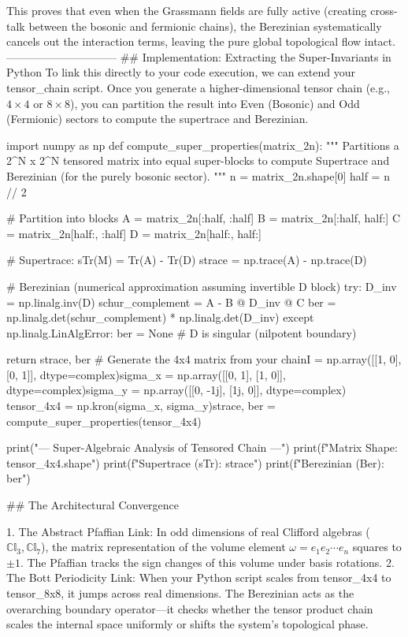 This proves that even when the Grassmann fields are fully active (creating cross-talk between the bosonic and fermionic chains), the Berezinian systematically cancels out the interaction terms, leaving the pure global topological flow intact.
------------------------------
## Implementation: Extracting the Super-Invariants in Python
To link this directly to your code execution, we can extend your tensor_chain script. Once you generate a higher-dimensional tensor chain (e.g., $4\times4$ or $8\times8$), you can partition the result into Even (Bosonic) and Odd (Fermionic) sectors to compute the supertrace and Berezinian.

import numpy as np
def compute_super_properties(matrix_2n):
    """
    Partitions a 2^N x 2^N tensored matrix into equal super-blocks
    to compute Supertrace and Berezinian (for the purely bosonic sector).
    """
    n = matrix_2n.shape[0]
    half = n // 2
    
    # Partition into blocks
    A = matrix_2n[:half, :half]
    B = matrix_2n[:half, half:]
    C = matrix_2n[half:, :half]
    D = matrix_2n[half:, half:]
    
    # Supertrace: sTr(M) = Tr(A) - Tr(D)
    strace = np.trace(A) - np.trace(D)
    
    # Berezinian (numerical approximation assuming invertible D block)
    try:
        D_inv = np.linalg.inv(D)
        schur_complement = A - B @ D_inv @ C
        ber = np.linalg.det(schur_complement) * np.linalg.det(D_inv)
    except np.linalg.LinAlgError:
        ber = None # D is singular (nilpotent boundary)
        
    return strace, ber
# Generate the 4x4 matrix from your chainI = np.array([[1, 0], [0, 1]], dtype=complex)sigma_x = np.array([[0, 1], [1, 0]], dtype=complex)sigma_y = np.array([[0, -1j], [1j, 0]], dtype=complex)
tensor_4x4 = np.kron(sigma_x, sigma_y)strace, ber = compute_super_properties(tensor_4x4)

print("--- Super-Algebraic Analysis of Tensored Chain ---")
print(f"Matrix Shape: {tensor_4x4.shape}")
print(f"Supertrace (sTr): {strace}")
print(f"Berezinian (Ber): {ber}")

## The Architectural Convergence

   1. The Abstract Pfaffian Link: In odd dimensions of real Clifford algebras ($\mathbb{Cl}_3, \mathbb{Cl}_7$), the matrix representation of the volume element $\omega = e_1 e_2 \cdots e_n$ squares to $\pm 1$. The Pfaffian tracks the sign changes of this volume under basis rotations.
   2. The Bott Periodicity Link: When your Python script scales from tensor_4x4 to tensor_8x8, it jumps across real dimensions. The Berezinian acts as the overarching boundary operator—it checks whether the tensor product chain scales the internal space uniformly or shifts the system's topological phase.

